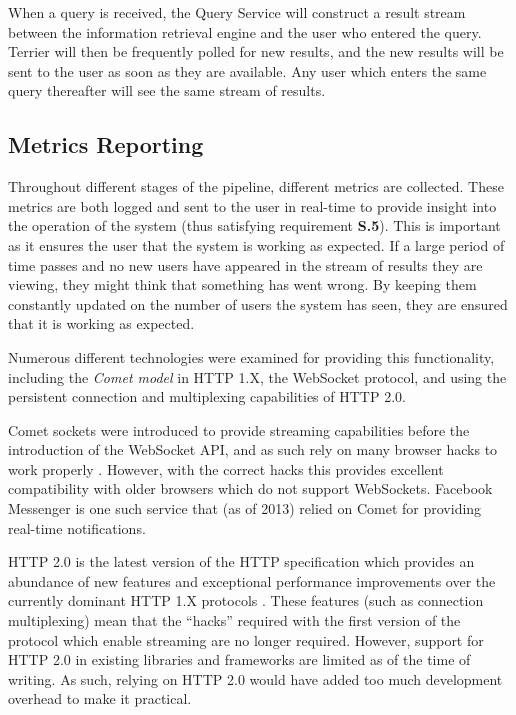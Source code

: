 \documentclass{l4proj}
\begin{document}
        When a query is received, the Query Service will construct a result stream between the information retrieval engine and the user who entered the query. Terrier will then be frequently polled for new results, and the new results will be sent to the user as soon as they are available. Any user which enters the same query thereafter will see the same stream of results.
              
        \subsection{Metrics Reporting}
        Throughout different stages of the pipeline, different metrics are collected. These metrics are both logged and sent to the user in real-time to provide insight into the operation of the system (thus satisfying requirement \textbf{S.5}). This is important as it ensures the user that the system is working as expected. If a large period of time passes and no new users have appeared in the stream of results they are viewing, they might think that something has went wrong. By keeping them constantly updated on the number of users the system has seen, they are ensured that it is working as expected.
        
        Numerous different technologies were examined for providing this functionality, including the \textit{Comet model} in HTTP 1.X, the WebSocket protocol, and using the persistent connection and multiplexing capabilities of HTTP 2.0.
        
        Comet sockets were introduced to provide streaming capabilities before the introduction of the WebSocket API, and as such rely on many browser hacks to work properly \cite{comet}. However, with the correct hacks this provides excellent compatibility with older browsers which do not support WebSockets. Facebook Messenger is one such service that (as of 2013) relied on Comet for providing real-time notifications.
        
        HTTP 2.0 is the latest version of the HTTP specification which provides an abundance of new features and exceptional performance improvements over the currently dominant HTTP 1.X protocols \cite{http2}. These features (such as connection multiplexing) mean that the ``hacks'' required with the first version of the protocol which enable streaming are no longer required. However, support for HTTP 2.0 in existing libraries and frameworks are limited as of the time of writing. As such, relying on HTTP 2.0 would have added too much development overhead to make it practical.    
        
\end{document}

